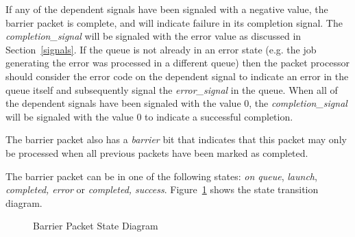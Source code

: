 \documentclass[final]{book}
\newcommand{\reffld}[1]{\textit{#1}}
\begin{document}
If any of the dependent signals have been signaled with a negative value, the
barrier packet is complete, and will indicate failure in its completion
signal. The \reffld{completion_signal} will be signaled with the error value as
discussed in Section~\ref{signals}. If the queue is not already in an error
state (e.g. the job generating the error was processed in a different queue)
then the packet processor should consider the error code on the dependent signal
to indicate an error in the queue itself and subsequently signal the
\reffld{error_signal} in the queue. When all of the dependent signals have been
signaled with the value 0, the \reffld{completion_signal} will be signaled with
the value 0 to indicate a successful completion.

The barrier packet also has a \reffld{barrier} bit that indicates that this
packet may only be processed when all previous packets have been marked as
completed.

The barrier packet can be in one of the following states: \emph{on queue},
\emph{launch}, \emph{completed, error} or \emph{completed,
  success}. Figure~\ref{fig:barrierpacketstate} shows the state transition
diagram.
\begin{figure}
  \centering
  \scriptsize
    \caption{Barrier Packet State Diagram}
  \label{fig:barrierpacketstate}
\end{figure}
\end{document}

